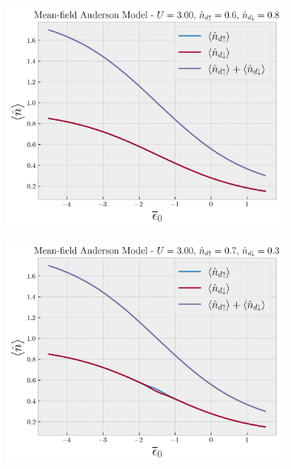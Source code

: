 \documentclass[a4paper,fleqn,12pt]{article}
\begin{document}
\begin{figure}[H]
\centering
\begin{subfigure}{.5\textwidth}
  \centering
  \includegraphics[width=\linewidth]{fig/plot-U_3.0-up_0.6-down_0.8.png}
\end{subfigure}%
\begin{subfigure}{.5\textwidth}
  \centering
  \includegraphics[width=\linewidth]{fig/plot-U_3.0-up_0.7-down_0.3.png}
\end{subfigure}
\end{figure}

\n\n\n\n
\end{document}

